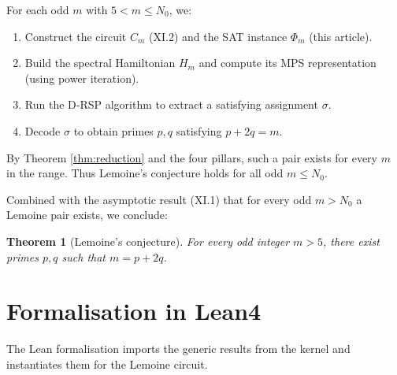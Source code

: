 \documentclass[11pt,a4paper]{article}
\newtheorem{theorem}{Theorem}[section]
\begin{document}
For each odd \(m\) with \(5 < m \le N_0\), we:
\begin{enumerate}
\item Construct the circuit \(C_m\) (XI.2) and the SAT instance \(\Phi_m\) (this article).
\item Build the spectral Hamiltonian \(H_m\) and compute its MPS representation (using power iteration).
\item Run the D‑RSP algorithm to extract a satisfying assignment \(\sigma\).
\item Decode \(\sigma\) to obtain primes \(p,q\) satisfying \(p+2q=m\).
\end{enumerate}
By Theorem \ref{thm:reduction} and the four pillars, such a pair exists for every \(m\) in the range. Thus Lemoine's conjecture holds for all odd \(m\le N_0\).

Combined with the asymptotic result (XI.1) that for every odd \(m>N_0\) a Lemoine pair exists, we conclude:

\begin{theorem}[Lemoine's conjecture]\label{thm:lemoine}
For every odd integer \(m > 5\), there exist primes \(p,q\) such that \(m = p + 2q\).
\end{theorem}

\section{Formalisation in Lean4}

The Lean formalisation imports the generic results from the kernel and instantiates them for the Lemoine circuit.
\end{document}
